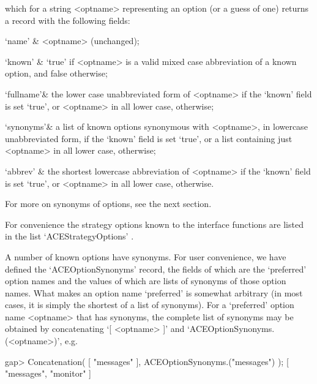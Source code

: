 which for a string <optname> representing an {\ACE} option (or a guess
of one) returns a record with the following fields:

\beginitems

\quad`name'   & <optname> (unchanged);

\quad`known'  & `true' if <optname> is a valid mixed case abbreviation
of a known {\ACE} option, and false otherwise;

\quad`fullname'& the lower case unabbreviated form of <optname> if the
`known'  field  is  set  `true',  or  <optname>  in  all  lower  case,
otherwise;

\quad`synonyms'& a  list  of  known  {\ACE}  options  synonymous  with
<optname>, in lowercase unabbreviated form, if the  `known'  field  is
set `true', or a list containing just <optname>  in  all  lower  case,
otherwise;

\quad`abbrev' & the shortest lowercase abbreviation  of  <optname>  if
the `known' field is set `true',  or  <optname>  in  all  lower  case,
otherwise.

\enditems

For more on synonyms of {\ACE} options, see the next section.

\enditems


For convenience the strategy options known  to  the  {\ACE}  interface
functions  are  listed  in  the   {\GAP}   list  `ACEStrategyOptions'%
{\undoquotes{}}.


A number of known {\ACE} options have synonyms. For user  convenience,
we     have      defined      the      `ACEOptionSynonyms'{\undoquotes
{}} record, the  fields
of which are the \lq{}preferred' option names and the values of  which
are lists of synonyms of those option names. What makes an option name
\lq{}preferred' is somewhat arbitrary (in most cases, it is simply the
shortest of a list of synonyms). For  a  \lq{}preferred'  option  name
<optname> that has synonyms, the complete  list  of  synonyms  may  be
obtained     by     concatenating     `[     <optname>     ]'      and
`ACEOptionSynonyms.(<optname>)', e.g.

\beginexample
gap> Concatenation( [ "messages" ], ACEOptionSynonyms.("messages") );
[ "messages", "monitor" ]
\endexample

